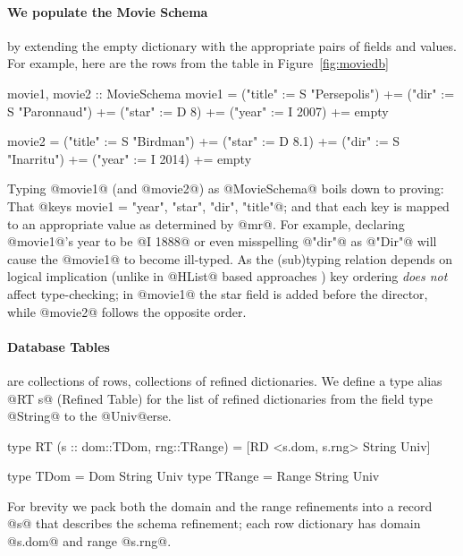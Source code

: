 \paragraph{We populate the Movie Schema} by extending the
empty dictionary with the appropriate pairs of fields and 
values. For example, here are the rows from the table
in Figure~\ref{fig:moviedb}
%
\begin{code}
  movie1, movie2 :: MovieSchema
  movie1 = ("title" := S "Persepolis")
        += ("dir"   := S "Paronnaud") 
        += ("star"  := D 8) 
        += ("year"  := I 2007) 
        += empty

  movie2 = ("title" := S "Birdman") 
        += ("star"  := D 8.1) 
        += ("dir"   := S "Inarritu")
        += ("year"  := I 2014) 
        += empty
\end{code}
%
Typing @movie1@ (and @movie2@) as @MovieSchema@
boils down to proving:
%
That @keys movie1 = {"year", "star", "dir", "title"}@;
and that each key is mapped to an appropriate value 
as determined by @mr@.
%
For example, declaring @movie1@'s year to be @I 1888@
or even misspelling @"dir"@ as @"Dir"@
will cause the @movie1@ to become ill-typed.
%
As the (sub)typing relation depends on logical 
implication (unlike in @HList@ based approaches 
\cite{heterogeneous}) key ordering \emph{does not} 
affect type-checking;
%
in @movie1@ the star field is added before the 
director, while @movie2@ follows the opposite order.

\paragraph{Database Tables} are collections of rows, 
\ie collections of refined dictionaries.
%
We define a type alias @RT s@ (Refined Table) for 
the list of refined dictionaries from the field 
type @String@ to the @Univ@erse.
%
\begin{code}
  type RT (s :: {dom::TDom, rng::TRange}) 
    = [RD <s.dom, s.rng> String Univ]

  type TDom   = Dom   String Univ
  type TRange = Range String Univ
\end{code}
%
For brevity we pack both the domain and the range 
refinements into a record @s@ that describes the 
schema refinement; \ie each row dictionary has 
domain @s.dom@ and range @s.rng@.

